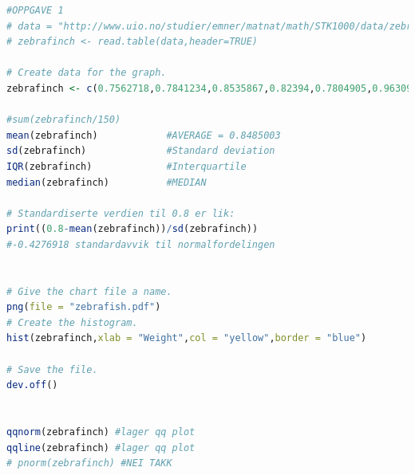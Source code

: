 \pagebreak
\begin{lstlisting}[language=R]
#OPPGAVE 1
# data = "http://www.uio.no/studier/emner/matnat/math/STK1000/data/zebrafinch.txt"
# zebrafinch <- read.table(data,header=TRUE)

# Create data for the graph.
zebrafinch <- c(0.7562718,0.7841234,0.8535867,0.82394,0.7804905,0.9630961,0.7417845,1.120064,0.8024751,0.8214675,0.7309519,0.8019651,0.9097601,0.7601681,0.8390591,0.9248859,0.8352816,0.7319939,0.7930914,0.7457873,1.002192,0.8628477,1.028025,0.7402723,0.9129746,0.7300062,0.8572898,0.8500707,0.7334023,0.7144842,0.984181,0.8167179,0.8441634,0.8281507,0.6719701,0.8034057,1.11701,1.007286,0.8168411,0.7305809,0.9279448,0.8405102,0.7958567,0.9990197,1.007542,0.6806091,0.8384404,0.8711419,0.7179686,0.9287494,0.8619765,0.8309871,0.5787197,0.7416669,0.8040855,0.8081294,0.907542,0.8482643,0.8560268,0.8655504,1.172754,0.9761892,0.8843472,0.9139844,0.5186183,0.9385081,0.9074842,0.9329575,1.090915,0.7363603,0.8898355,0.8577158,1.025406,0.6654378,0.6658608,0.6768501,0.9794527,0.8301966,0.8290008,0.8836586,0.8157841,0.964259,0.9287292,0.9011676,0.7669517,0.7306965,0.9245895,0.9635717,0.7862857,0.8990346,0.7850173,0.8521878,0.7135978,0.8522143,0.8528686,0.9675156,0.6637724,0.8162315,0.9481493,0.867313,0.936353,0.986539,0.8309639,0.7233021,1.044636,0.6885234,0.9870739,0.7755702,0.7006348,0.8671587,1.109845,0.9798947,0.8143468,0.8347534,0.8840403,0.7789924,0.7760159,0.8019032,0.6420586,0.8729059,0.8722336,0.7732556,0.9370564,0.8527847,0.9538383,0.8060772,0.7286053,0.8899104,0.7440977,0.9768809,1.050496,0.5891953,0.8203677,0.8185292,0.7594463,0.8304673,0.9525384,0.966009,0.8968909,0.9481618,0.738298,0.7978259,0.7972277,0.6588164,0.9295452,1.002859,0.9822667,0.8677425,0.8259351,0.8138577)

#sum(zebrafinch/150)
mean(zebrafinch)			#AVERAGE = 0.8485003
sd(zebrafinch)				#Standard deviation
IQR(zebrafinch)				#Interquartile
median(zebrafinch)			#MEDIAN

# Standardiserte verdien til 0.8 er lik:
print((0.8-mean(zebrafinch))/sd(zebrafinch))
#-0.4276918 standardavvik til normalfordelingen


# Give the chart file a name.
png(file = "zebrafish.pdf")
# Create the histogram.
hist(zebrafinch,xlab = "Weight",col = "yellow",border = "blue")

# Save the file.
dev.off()


qqnorm(zebrafinch) #lager qq plot
qqline(zebrafinch) #lager qq plot
# pnorm(zebrafinch) #NEI TAKK
\end{lstlisting}



